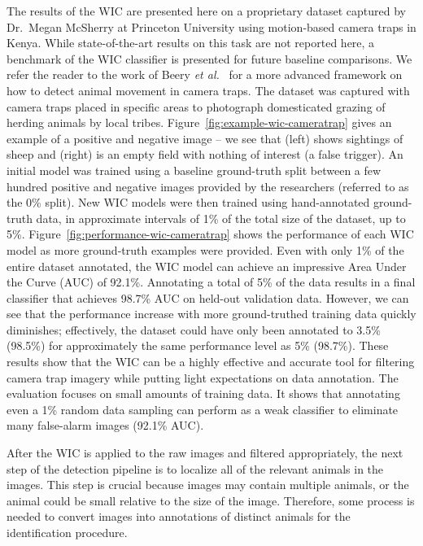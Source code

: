 The results of the WIC are presented here on a proprietary dataset captured by Dr.\ Megan McSherry at Princeton University using motion-based camera traps in Kenya.  While state-of-the-art results on this task are not reported here, a benchmark of the WIC classifier is presented for future baseline comparisons.  We refer the reader to the work of Beery \textit{et al.}~\cite{beery_recognition_2018} for a more advanced framework on how to detect animal movement in camera traps.  The dataset was captured with camera traps placed in specific areas to photograph domesticated grazing of herding animals by local tribes.  Figure~\ref{fig:example-wic-cameratrap} gives an example of a positive and negative image -- we see that (left) shows sightings of sheep and (right) is an empty field with nothing of interest (a false trigger).  An initial model was trained using a baseline ground-truth split between a few hundred positive and negative images provided by the researchers (referred to as the 0\% split).  New WIC models were then trained using hand-annotated ground-truth data, in approximate intervals of 1\% of the total size of the dataset, up to 5\%.  Figure~\ref{fig:performance-wic-cameratrap} shows the performance of each WIC model as more ground-truth examples were provided.  Even with only 1\% of the entire dataset annotated, the WIC model can achieve an impressive Area Under the Curve (AUC) of 92.1\%.  Annotating a total of 5\% of the data results in a final classifier that achieves 98.7\% AUC on held-out validation data.  However, we can see that the performance increase with more ground-truthed training data quickly diminishes; effectively, the dataset could have only been annotated to 3.5\% (98.5\%) for approximately the same performance level as 5\% (98.7\%).  These results show that the WIC can be a highly effective and accurate tool for filtering camera trap imagery while putting light expectations on data annotation.  The evaluation focuses on small amounts of training data.  It shows that annotating even a 1\% random data sampling can perform as a weak classifier to eliminate many false-alarm images (92.1\% AUC).

After the WIC is applied to the raw images and filtered appropriately, the next step of the detection pipeline is to localize all of the relevant animals in the images.  This step is crucial because images may contain multiple animals, or the animal could be small relative to the size of the image. Therefore, some process is needed to convert images into annotations of distinct animals for the identification procedure.

